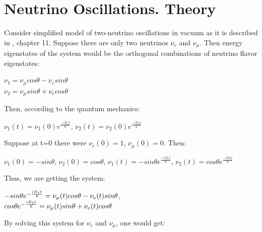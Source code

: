 \section{Neutrino Oscillations. Theory}


Consider simplified model of two-neutrino oscillations in vacuum as it is described in \cite{ref_Griffiths}, chapter 11. Suppose there are only two neutrinos $\nu_e$ and $\nu_{\mu}$. Then energy eigenstates of the system would be the orthogonal combinations of neutrino flavor eigenstates:\\

\begin{center}
$\nu_1=\nu_{\mu}cos\theta-\nu_esin\theta$\\
$\nu_2=\nu_{\mu}sin\theta+\nu_ecos\theta$\\
\end{center}

Then, according to the quantum mechanics:\\
\begin{center}
$\nu_1(t)=\nu_1(0)e^{\frac{-iE_1t}{\hbar}}$, $\nu_2(t)=\nu_2(0)e^{\frac{-iE_2t}{\hbar}}$\\
\end{center}

Suppose at t=0 there were $\nu_e(0)=1$, $\nu_\mu(0)=0$. Then:\\ 
\begin{center}
$\nu_1(0)=-sin\theta$, $\nu_2(0)=cos\theta$, $\nu_1(t)=-{sin\theta}e^{\frac{-iE_1t}{\hbar}}$, $\nu_2(t)={cos\theta}e^{\frac{-iE_2t}{\hbar}}$\\
\end{center}

Thus, we are getting the system:\\
\begin{center}
$-{sin\theta}e^{-{{iE_1t} \over \hbar}}=\nu_\mu(t)cos\theta-\nu_e(t)sin\theta$,\\
${cos\theta}e^{-{{iE_2t} \over \hbar}}=\nu_\mu(t)sin\theta+\nu_e(t)cos\theta$\\
\end{center}

By solving this system for $\nu_e$ and $\nu_\mu$, one would get:\\

